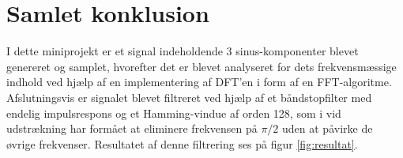 \section{Samlet konklusion}
I dette miniprojekt er et signal indeholdende 3 sinus-komponenter blevet genereret og samplet, hvorefter det er blevet analyseret for dets frekvensmæssige indhold ved hjælp af en implementering af DFT'en i form af en FFT-algoritme. Afslutningsvis er signalet blevet filtreret ved hjælp af et båndstopfilter med endelig impulsrespons og et Hamming-vindue af orden 128, som i vid udstrækning har formået at eliminere frekvensen på $\pi/2$ uden at påvirke de øvrige frekvenser. Resultatet af denne filtrering ses på figur \ref{fig:resultat}.